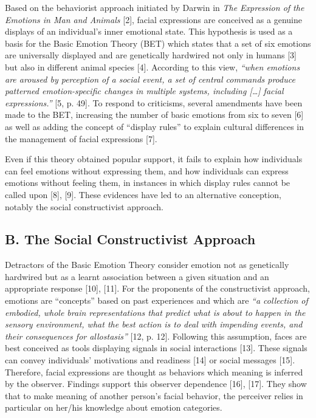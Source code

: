 \documentclass[conference,final,]{IEEEtran}
\begin{document}
Based on the behaviorist approach initiated by Darwin in \emph{The
Expression of the Emotions in Man and Animals} {[}2{]}, facial
expressions are conceived as a genuine displays of an individual's inner
emotional state. This hypothesis is used as a basis for the Basic
Emotion Theory (BET) which states that a set of six emotions are
universally displayed and are genetically hardwired not only in humans
{[}3{]} but also in different animal species {[}4{]}. According to this
view, \emph{``when emotions are aroused by perception of a social event,
a set of central commands produce patterned emotion-specific changes in
multiple systems, including {[}\ldots{}{]} facial expressions.''} {[}5,
p. 49{]}. To respond to criticisms, several amendments have been made to
the BET, increasing the number of basic emotions from six to seven
{[}6{]} as well as adding the concept of ``display rules'' to explain
cultural differences in the management of facial expressions {[}7{]}.

Even if this theory obtained popular support, it fails to explain how
individuals can feel emotions without expressing them, and how
individuals can express emotions without feeling them, in instances in
which display rules cannot be called upon {[}8{]}, {[}9{]}. These
evidences have led to an alternative conception, notably the social
constructivist approach.

\hypertarget{b.-the-social-constructivist-approach}{%
\subsection{B. The Social Constructivist
Approach}\label{b.-the-social-constructivist-approach}}

Detractors of the Basic Emotion Theory consider emotion not as
genetically hardwired but as a learnt association between a given
situation and an appropriate response {[}10{]}, {[}11{]}. For the
proponents of the constructivist approach, emotions are ``concepts''
based on past experiences and which are \emph{``a collection of
embodied, whole brain representations that predict what is about to
happen in the sensory environment, what the best action is to deal with
impending events, and their consequences for allostasis''} {[}12, p.
12{]}. Following this assumption, faces are best conceived as tools
displaying signals in social interactions {[}13{]}. These signals can
convey individuals' motivations and readiness {[}14{]} or social
messages {[}15{]}. Therefore, facial expressions are thought as
behaviors which meaning is inferred by the observer. Findings support
this observer dependence {[}16{]}, {[}17{]}. They show that to make
meaning of another person's facial behavior, the perceiver relies in
particular on her/his knowledge about emotion categories.
\end{document}

